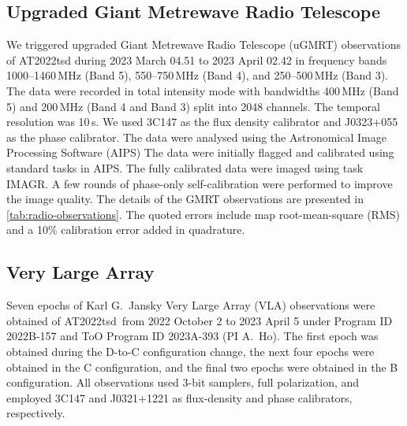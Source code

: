 \documentclass{nature_plusfigure}
\newcommand{\at}{AT2022tsd}
\begin{document}
\begin{methods}


\subsection{Upgraded Giant Metrewave Radio Telescope}
\label{sec:GMRT}

We triggered upgraded Giant Metrewave Radio Telescope (uGMRT) observations of AT2022tsd
during 2023 March 04.51 to 2023 April 02.42 in frequency bands 1000--1460\,MHz
(Band 5), 550--750\,MHz (Band 4), and 250--500\,MHz (Band 3). The data were recorded
in total intensity mode with bandwidths 400\,MHz (Band 5) and 200\,MHz (Band 4 and Band 3)
split into 2048 channels. The temporal resolution was 10\,s. We used 3C147 as the flux density
calibrator and J0323+055 as the phase calibrator.
The data were analysed\cite{Nayana2017} using the Astronomical Image Processing Software (AIPS\cite{Greisen2003})
The data were initially flagged and calibrated using standard tasks in AIPS. The fully calibrated data were imaged
using task IMAGR. A few rounds of phase-only self-calibration were performed to improve the
image quality. The details of the GMRT observations are presented in \ref{tab:radio-observations}. The quoted errors
include map root-mean-square (RMS) and a 10\% calibration error added in quadrature.

\subsection{Very Large Array}
\label{sec:VLA}

Seven epochs of Karl G.\ Jansky Very Large Array (VLA\cite{Perley2011}) observations were obtained of \at\ from 2022 October 2 to 2023 April 5 under Program ID 2022B-157 and ToO Program ID 2023A-393 (PI A.\ Ho).
The first epoch was obtained during the D-to-C configuration change, the next four epochs were obtained in the C configuration, and the final two epochs were obtained in the B configuration.
All observations used 3-bit samplers, full polarization, and employed 3C147 and J0321+1221 as flux-density and phase calibrators, respectively.


\end{methods}
\end{document}
